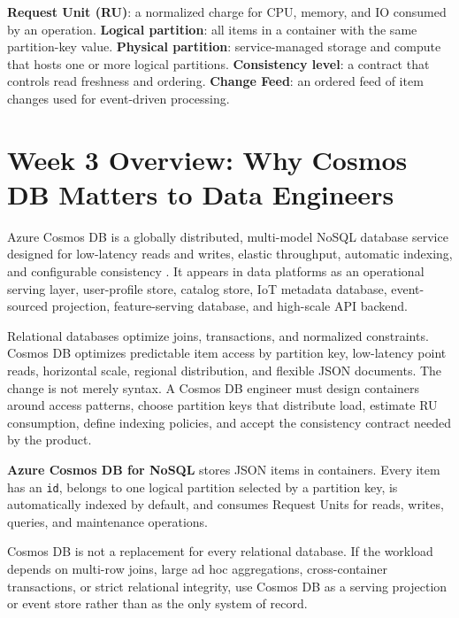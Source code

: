 \begin{keyterms}
\textbf{Request Unit (RU)}: a normalized charge for CPU, memory, and IO consumed by an operation.\quad
\textbf{Logical partition}: all items in a container with the same partition-key value.\quad
\textbf{Physical partition}: service-managed storage and compute that hosts one or more logical partitions.\quad
\textbf{Consistency level}: a contract that controls read freshness and ordering.\quad
\textbf{Change Feed}: an ordered feed of item changes used for event-driven processing.
\end{keyterms}

\section{Week 3 Overview: Why Cosmos DB Matters to Data Engineers}
Azure Cosmos DB is a globally distributed, multi-model NoSQL database service designed for low-latency reads and writes, elastic throughput, automatic indexing, and configurable consistency \cite{microsoft2025cosmosOverview}. It appears in data platforms as an operational serving layer, user-profile store, catalog store, IoT metadata database, event-sourced projection, feature-serving database, and high-scale API backend.

Relational databases optimize joins, transactions, and normalized constraints. Cosmos DB optimizes predictable item access by partition key, low-latency point reads, horizontal scale, regional distribution, and flexible JSON documents. The change is not merely syntax. A Cosmos DB engineer must design containers around access patterns, choose partition keys that distribute load, estimate RU consumption, define indexing policies, and accept the consistency contract needed by the product.

\begin{definitionbox}
\textbf{Azure Cosmos DB for NoSQL} stores JSON items in containers. Every item has an \texttt{id}, belongs to one logical partition selected by a partition key, is automatically indexed by default, and consumes Request Units for reads, writes, queries, and maintenance operations.
\end{definitionbox}

\begin{notebox}
Cosmos DB is not a replacement for every relational database. If the workload depends on multi-row joins, large ad hoc aggregations, cross-container transactions, or strict relational integrity, use Cosmos DB as a serving projection or event store rather than as the only system of record.
\end{notebox}

